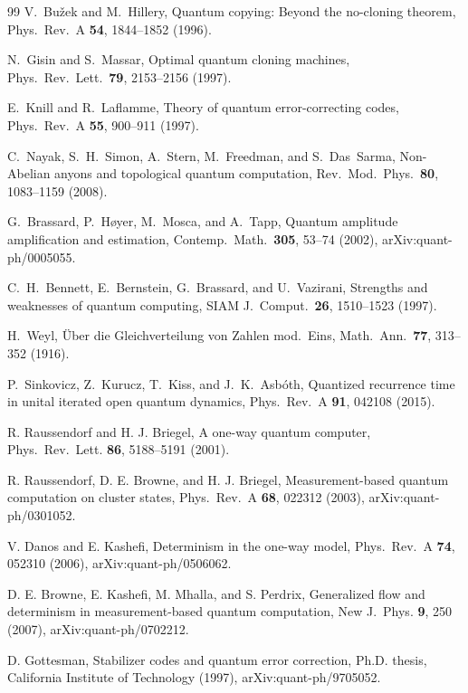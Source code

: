 \documentclass[aps,pra,onecolumn,superscriptaddress,nofootinbib,10pt]{revtex4-2}
\theoremstyle{definition}
\theoremstyle{remark}
\begin{document}
\begin{thebibliography}{99}
 V.~Bu\v zek and M.~Hillery, Quantum copying: Beyond the no-cloning theorem, Phys.\ Rev.\ A \textbf{54}, 1844--1852 (1996).

 N.~Gisin and S.~Massar, Optimal quantum cloning machines, Phys.\ Rev.\ Lett.\ \textbf{79}, 2153--2156 (1997).

 E.~Knill and R.~Laflamme, Theory of quantum error-correcting codes, Phys.\ Rev.\ A \textbf{55}, 900--911 (1997).

 C.~Nayak, S.~H.~Simon, A.~Stern, M.~Freedman, and S.~Das~Sarma, Non-Abelian anyons and topological quantum computation, Rev.\ Mod.\ Phys.\ \textbf{80}, 1083--1159 (2008).

 G.~Brassard, P.~H{\o}yer, M.~Mosca, and A.~Tapp, Quantum amplitude amplification and estimation, Contemp.\ Math.\ \textbf{305}, 53--74 (2002), arXiv:quant-ph/0005055.

 C.~H.~Bennett, E.~Bernstein, G.~Brassard, and U.~Vazirani, Strengths and weaknesses of quantum computing, SIAM J.\ Comput.\ \textbf{26}, 1510--1523 (1997).

 H.~Weyl, \"Uber die Gleichverteilung von Zahlen mod.\ Eins, Math.\ Ann.\ \textbf{77}, 313--352 (1916).

 P.~Sinkovicz, Z.~Kurucz, T.~Kiss, and J.~K.~Asb\'oth, Quantized recurrence time in unital iterated open quantum dynamics, Phys.\ Rev.\ A \textbf{91}, 042108 (2015).

 R. Raussendorf and H. J. Briegel, A one-way quantum computer, Phys.\ Rev.\ Lett. \textbf{86}, 5188--5191 (2001).

 R. Raussendorf, D. E. Browne, and H. J. Briegel, Measurement-based quantum computation on cluster states, Phys.\ Rev.\ A \textbf{68}, 022312 (2003), arXiv:quant-ph/0301052.

 V. Danos and E. Kashefi, Determinism in the one-way model, Phys.\ Rev.\ A \textbf{74}, 052310 (2006), arXiv:quant-ph/0506062.

 D. E. Browne, E. Kashefi, M. Mhalla, and S. Perdrix, Generalized flow and determinism in measurement-based quantum computation, New J.\ Phys. \textbf{9}, 250 (2007), arXiv:quant-ph/0702212.

 D. Gottesman, Stabilizer codes and quantum error correction, Ph.D. thesis, California Institute of Technology (1997), arXiv:quant-ph/9705052.


\end{thebibliography}
\end{document}
